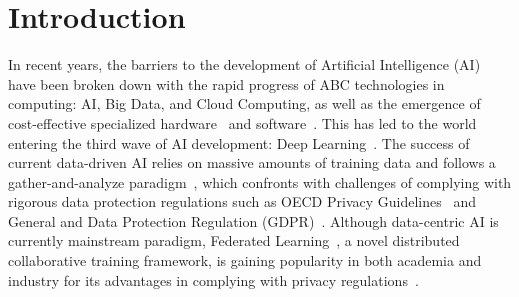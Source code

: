 \section{Introduction}


In recent years, the barriers to the development of Artificial Intelligence (AI) have been broken down with the rapid progress of ABC technologies in computing: AI, Big Data, and Cloud Computing, as well as the emergence of cost-effective specialized hardware~\cite{sze2017efficient} and software~\cite{jia2014caffe}. This has led to the world entering the third wave of AI development: Deep Learning~\cite{lecun2015deep}.
The success of current data-driven AI relies on massive amounts of training data and follows a gather-and-analyze paradigm~\cite{whang2023data}, which confronts with challenges of complying with rigorous data protection regulations such as OECD Privacy Guidelines~\cite{tene2011privacy} and General and Data Protection Regulation (GDPR)~\cite{voigt2017eu}.
Although data-centric AI is currently mainstream paradigm, Federated Learning~\cite{li2020federated}, a novel distributed collaborative training framework, is gaining popularity in both academia and industry for its advantages in complying with privacy regulations~\cite{truong2021privacy}.

